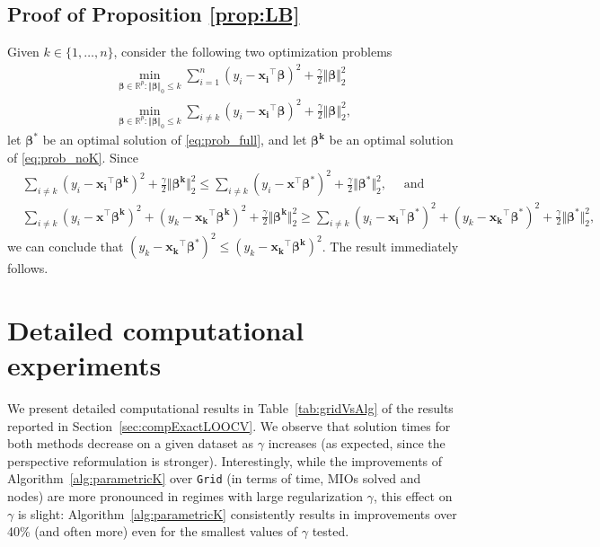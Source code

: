 \documentclass[opre,nonblindrev]{informs3} %
\begin{document}
{\subsection{Proof of Proposition \ref{prop:LB}}\label{ssec:prop1}
Given $k\in \{1,\dots,n\}$, consider the following two optimization problems
	\begin{align}
		\min_{\bm{\beta}\in \mathbb{R}^p: \Vert \bm{\beta}\Vert_0 \leq k}\sum_{i=1}^n(y_i -\bm{x_i}^\top \bm{\beta})^2+\frac{\gamma}{2}\Vert \bm{\beta}\Vert_2^2\label{eq:prob_full}\\
		\min_{\bm{\beta}\in \mathbb{R}^p: \Vert \bm{\beta}\Vert_0 \leq k}\sum_{i\neq k}(y_i -\bm{x_i}^\top \bm{\beta})^2+\frac{\gamma}{2}\Vert \bm{\beta}\Vert_2^2,\label{eq:prob_noK}
	\end{align}
let $\bm{\beta^*}$ be an optimal solution of \eqref{eq:prob_full}, and let $\bm{\beta^k}$ be an optimal solution of \eqref{eq:prob_noK}. Since \begin{align*}&\sum_{i\neq k}(y_i -\bm{x_i}^\top \bm{\beta^k})^2+\frac{\gamma}{2}\Vert \bm{\beta^k}\Vert_2^2\leq \sum_{i\neq k}(y_i -\bm{x}^\top \bm{\beta^*})^2+\frac{\gamma}{2}\Vert \bm{\beta^*}\Vert_2^2,\quad \text{ and }\\
&\sum_{i\neq k}(y_i -\bm{x}^\top \bm{\beta^k})^2+(y_k -\bm{x_k}^\top \bm{\beta^k})^2+\frac{\gamma}{2}\Vert \bm{\beta^k}\Vert_2^2\geq \sum_{i\neq k}(y_i -\bm{x_i}^\top \bm{\beta^*})^2+(y_k -\bm{x_k}^\top \bm{\beta^*})^2+\frac{\gamma}{2}\Vert \bm{\beta^*}\Vert_2^2,
\end{align*}
we can conclude that $(y_k -\bm{x_k}^\top \bm{\beta^*})^2\leq  (y_k -\bm{x_k}^\top \bm{\beta^k})^2$. The result immediately follows. \Halmos \endproof

\section{Detailed computational experiments}\label{sec:compTable}

We present detailed computational results in Table~\ref{tab:gridVsAlg} of the results reported in Section~\ref{sec:compExactLOOCV}. We observe that solution times for both methods decrease on a given dataset as $\gamma$ increases (as expected, since the perspective reformulation is stronger). Interestingly, while the improvements of Algorithm~\ref{alg:parametricK} over \texttt{Grid} (in terms of time, MIOs solved and nodes) are more pronounced in regimes with large regularization $\gamma$, this effect on $\gamma$ is slight: Algorithm~\ref{alg:parametricK} consistently results in improvements over 40\% (and often more) even for the smallest values of $\gamma$ tested.

}
\end{document}
